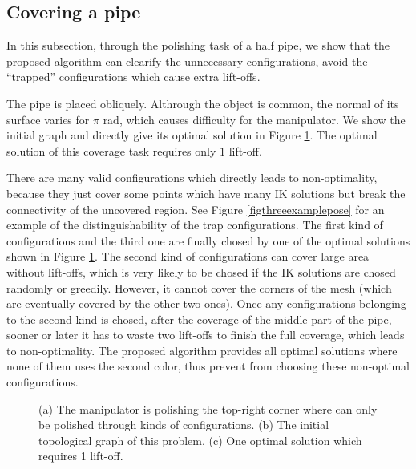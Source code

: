 \documentclass[journal]{IEEEtran}
\begin{document}
\subsection{Covering a pipe}
In this subsection, through the polishing task of a half pipe, we show that the proposed algorithm can clearify the unnecessary configurations, avoid the ``trapped'' configurations which cause extra lift-offs. 

The pipe is placed obliquely. Althrough the object is common, the normal of its surface varies for $\pi$ rad, which causes difficulty for the manipulator. We show the initial graph and directly give its optimal solution in Figure \ref{fighalfpipe}. The optimal solution of this coverage task requires only $1$ lift-off. 

There are many valid configurations which directly leads to non-optimality, because they just cover some points which have many IK solutions but break the connectivity of the uncovered region. 
See Figure \ref{figthreeexamplepose} for an example of the distinguishability of the trap configurations. 
The first kind of configurations and the third one are finally chosed by one of the optimal solutions shown in Figure \ref{fighalfpipe}. 
The second kind of configurations can cover large area without lift-offs, which is very likely to be chosed if the IK solutions are chosed randomly or greedily. However, it cannot cover the corners of the mesh (which are eventually covered by the other two ones). Once any configurations belonging to the second kind is chosed, after the coverage of the middle part of the pipe, sooner or later it has to waste two lift-offs to finish the full coverage, which leads to non-optimality. The proposed algorithm provides all optimal solutions where none of them uses the second color, thus prevent from choosing these non-optimal configurations. 
\begin{figure}[t]
\centering
{}
\caption{(a) The manipulator is polishing the top-right corner where can only be polished through kinds of configurations. (b) The initial topological graph of this problem. (c) One optimal solution which requires 1 lift-off.}\label{fighalfpipe}
\end{figure}
\end{document}
